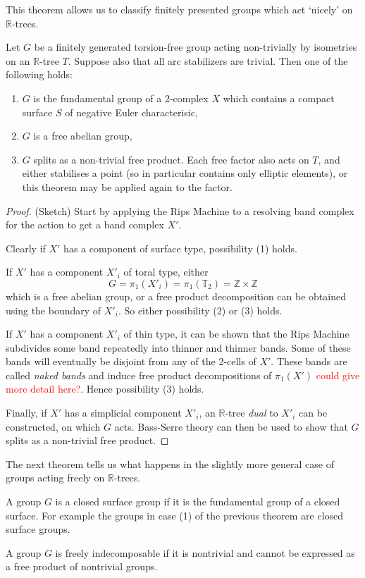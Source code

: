 This theorem allows us to classify finitely presented groups which act `nicely' on $\mathbb{R}$-trees.
\begin{theorem}\label{rtreesclassification}
    Let $G$ be a finitely generated torsion-free group acting non-trivially by isometries on an $\mathbb{R}$-tree $T$. Suppose also that all arc stabilizers are trivial. Then one of the following holds:
    \begin{enumerate}
        \item $G$ is the fundamental group of a 2-complex $X$ which contains a compact surface $S$ of negative Euler characterisic,
        \item $G$ is a free abelian group,
        \item $G$ splits as a non-trivial free product. Each free factor also acts on $T$, and either stabilises a point (so in particular contains only elliptic elements), or this theorem may be applied again to the factor.
    \end{enumerate}
\end{theorem}
\begin{proof} (Sketch)
    Start by applying the Rips Machine to a resolving band complex for the action to get a band complex $X'$. 

    Clearly if $X'$ has a component of surface type, possibility (1) holds.

    If $X'$ has a component $X'_i$ of toral type, either \[G=\pi_1(X'_i)=\pi_1(\mathbb{T}_2)=\mathbb{Z}\times\mathbb{Z}\] which is a free abelian group, or a free product decomposition can be obtained using the boundary of $X'_i$. So either possibility (2) or (3) holds. 

    If $X'$ has a component $X'_i$ of thin type, it can be shown that the Rips Machine subdivides some band repeatedly into thinner and thinner bands. Some of these bands will eventually be disjoint from any of the 2-cells of $X'$. These bands are called \textit{naked bands} and induce free product decompositions of $\pi_1(X')$ \textcolor{red}{could give more detail here?}. Hence possibility (3) holds.

    Finally, if $X'$ has a simplicial component $X'_i$, an $\mathbb{R}$-tree \textit{dual} to $X'_i$ can be constructed, on which $G$ acts. Bass-Serre theory can then be used to show that $G$ splits as a non-trivial free product.
\end{proof}

The next theorem tells us what happens in the slightly more general case of groups acting freely on $\mathbb{R}$-trees.
\begin{definition}
    A group $G$ is a \textnormal{closed surface group} if it is the fundamental group of a closed surface. For example the groups in case (1) of the previous theorem are closed surface groups.
\end{definition}
\begin{definition}
    A group $G$ is \textnormal{freely indecomposable} if it is nontrivial and cannot be expressed as a free product of nontrivial groups.
\end{definition}

